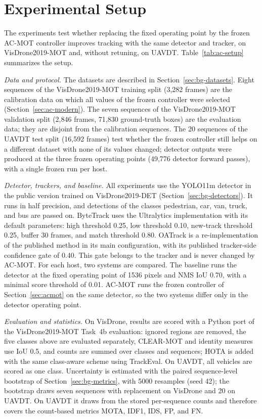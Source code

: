\section{Experimental Setup}\label{sec:ac-setup}
The experiments test whether replacing the fixed operating point by the frozen AC-MOT controller improves tracking with the same detector and tracker, on VisDrone2019-MOT and, without retuning, on UAVDT. Table~\ref{tab:ac-setup} summarizes the setup.

\emph{Data and protocol.} The datasets are described in Section~\ref{sec:bg-datasets}. Eight sequences of the VisDrone2019-MOT training split (3,282 frames) are the calibration data on which all values of the frozen controller were selected (Section~\ref{sec:ac-modern}). The seven sequences of the VisDrone2019-MOT validation split (2,846 frames, 71,830 ground-truth boxes) are the evaluation data; they are disjoint from the calibration sequences. The 20 sequences of the UAVDT test split (16,592 frames) test whether the frozen controller still helps on a different dataset with none of its values changed; detector outputs were produced at the three frozen operating points (49,776 detector forward passes), with a single frozen run per host.

\emph{Detector, trackers, and baseline.} All experiments use the YOLO11m detector \cite{jocher2024yolo11} in the public version trained on VisDrone2019-DET (Section~\ref{sec:bg-detectors}). It runs in half precision, and detections of the classes pedestrian, car, van, truck, and bus are passed on. ByteTrack uses the Ultralytics implementation with its default parameters: high threshold 0.25, low threshold 0.10, new-track threshold 0.25, buffer 30 frames, and match threshold 0.80. OATrack is a re-implementation of the published method \cite{qi2026oatrack} in its main configuration, with its published tracker-side confidence gate of 0.40. This gate belongs to the tracker and is never changed by AC-MOT. For each host, two systems are compared. The baseline runs the detector at the fixed operating point of 1536 pixels and NMS IoU 0.70, with a minimal score threshold of 0.01. AC-MOT runs the frozen controller of Section~\ref{sec:acmot} on the same detector, so the two systems differ only in the detector operating point.

\emph{Evaluation and statistics.} On VisDrone, results are scored with a Python port of the VisDrone2019-MOT Task~4b evaluation: ignored regions are removed, the five classes above are evaluated separately, CLEAR-MOT and identity measures use IoU 0.5, and counts are summed over classes and sequences; HOTA is added with the same class-aware scheme using TrackEval. On UAVDT, all vehicles are scored as one class. Uncertainty is estimated with the paired sequence-level bootstrap of Section~\ref{sec:bg-metrics}, with 5000 resamples (seed 42); the bootstrap draws seven sequences with replacement on VisDrone and 20 on UAVDT. On UAVDT it draws from the stored per-sequence counts and therefore covers the count-based metrics MOTA, IDF1, IDS, FP, and FN.

